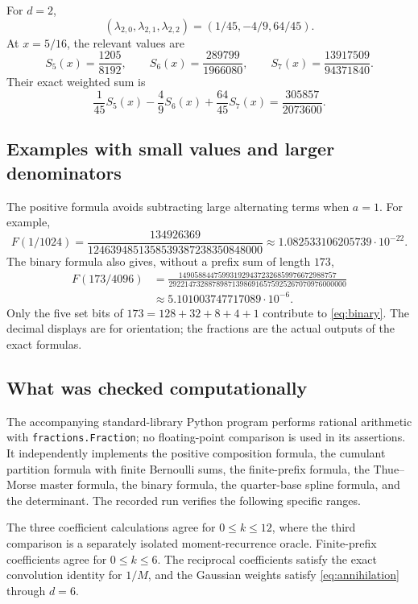 \documentclass[11pt,a4paper]{article}
\theoremstyle{definition}
\theoremstyle{remark}
\begin{document}
For \(d=2\),
\[
 (\lambda_{2,0},\lambda_{2,1},\lambda_{2,2})
       =(1/45,-4/9,64/45).
\]
At \(x=5/16\), the relevant values are
\[
 S_5(x)=\frac{1205}{8192},\qquad
 S_6(x)=\frac{289799}{1966080},\qquad
 S_7(x)=\frac{13917509}{94371840}.
\]
Their exact weighted sum is
\[
 \frac1{45}S_5(x)-\frac49S_6(x)+\frac{64}{45}S_7(x)
          =\frac{305857}{2073600}.
\]

\subsection{Examples with small values and larger denominators}
The positive formula avoids subtracting large alternating terms when \(a=1\).
For example,
\[
 F(1/1024)=\frac{134926369}{1246394851358539387238350848000}
          \approx1.082533106205739\cdot10^{-22}.
\]
The binary formula also gives, without a prefix sum of length \(173\),
\begin{equation}
 \begin{aligned}
 F(173/4096)&=
 \frac{1490588447599319294372326859976672988757}
      {292214732887898713986916575925267070976000000}\\
 &\approx5.101003747717089\cdot10^{-6}.
 \end{aligned}                                        \label{eq:large-example}
\end{equation}
Only the five set bits of \(173=128+32+8+4+1\) contribute to
\eqref{eq:binary}.  The decimal displays are for orientation; the fractions are the
actual outputs of the exact formulas.

\subsection{What was checked computationally}
The accompanying standard-library Python program performs rational arithmetic with
\texttt{fractions.Fraction}; no floating-point comparison is used in its assertions.
It independently implements the positive composition formula, the cumulant partition
formula with finite Bernoulli sums, the finite-prefix formula, the Thue--Morse master
formula, the binary formula, the quarter-base spline formula, and the determinant.
The recorded run verifies the following specific ranges.

The three coefficient calculations agree for \(0\leq k\leq12\), where the third
comparison is a separately isolated moment-recurrence oracle.  Finite-prefix
coefficients agree for \(0\leq k\leq6\).  The reciprocal coefficients satisfy the
exact convolution identity for \(1/M\), and the Gaussian weights satisfy
\eqref{eq:annihilation} through \(d=6\).
\end{document}
